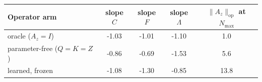 {\scriptsize\setlength{\tabcolsep}{4pt}
\begin{tabular}{l c c c c}
\toprule
Operator arm & slope $C$ & slope $F$ & slope $\Lambda$ & $\|A_z\|_{\mathrm{op}}$ at $N_{\max}$ \\
\midrule
oracle ($A_z{=}I$) & -1.03 & -1.01 & -1.10 & 1.0 \\
parameter-free ($Q{=}K{=}Z$) & -0.86 & -0.69 & -1.53 & 5.6 \\
learned, frozen & -1.08 & -1.30 & -0.85 & 13.8 \\
\bottomrule
\end{tabular}}

